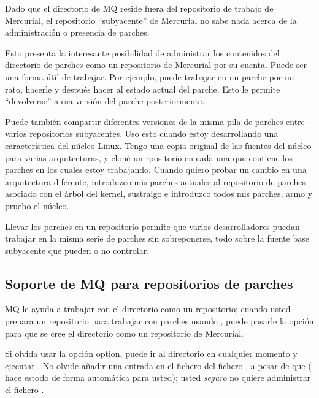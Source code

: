 Dado que el directorio  de MQ reside fuera del
repositorio de trabajo de Mercurial, el repositorio ``subyacente'' de
Mercurial no sabe nada acerca de la administración o presencia de
parches.

Esto presenta la interesante posibilidad de administrar los contenidos
del directorio de parches como un repositorio de Mercurial por su
cuenta.  Puede ser una forma útil de trabajar.  Por ejemplo, puede
trabajar en un parche por un rato, hacerle  y
después hacer  al estado actual del parche.  Esto le
permite ``devolverse'' a esa versión del parche posteriormente.

Puede también compartir diferentes versiones de la misma pila de
parches entre varios repositorios subyacentes.  Uso esto cuando estoy
desarrollando una característica del núcleo Linux.  Tengo una copia
original de las fuentes del núcleo para varias arquitecturas, y cloné
un rpositorio en cada una que contiene los parches en los cuales
estoy trabajando.  Cuando quiero probar un cambio en una arquitectura
diferente, introduzco mis parches actuales al repositorio de parches
asociado con el árbol del kernel, sustraigo e introduzco todos mis
parches, armo y pruebo el núcleo.

Llevar los parches en un repositorio permite que varios
desarrolladores puedan trabajar en la misma serie de parches sin
sobreponerse, todo sobre la fuente base subyacente que pueden o no
controlar.

\subsection{Soporte de MQ para repositorios de parches}

MQ le ayuda a trabajar con el directorio  como
un repositorio; cuando usted prepara un repositorio para trabajar con
parches usando , puede pasarle la opción
 para que se cree el directorio
 como un repositorio de Mercurial.

\begin{note}
  Si olvida usar la opción  option, puede ir al
  directorio  en cualquier momento y ejecutar
  .  No olvide añadir una entrada en el fichero
   del fichero , a pesar de que
  ( hace estodo de forma
  automática para usted); usted \emph{seguro} no quiere administrar el
  fichero .
\end{note}

